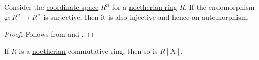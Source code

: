 \begin{proposition}\label{thm:surjective_endomorphism_in_free_module}
  Consider the \hyperref[def:sequence_space]{coordinate space} \( R^n \) for a \hyperref[def:noetherian_semiring]{noetherian ring} \( R \). If the endomorphism \( \varphi: R^n \to R^n \) is surjective, then it is also injective and hence an automorphism.
\end{proposition}
\begin{proof}
  Follows from  and .
\end{proof}

\begin{theorem}\label{thm:hilberts_basis_theorem}
  If \( R \) is a \hyperref[def:noetherian_semiring]{noetherian} commutative ring, then so is \( R[X] \).
\end{theorem}
